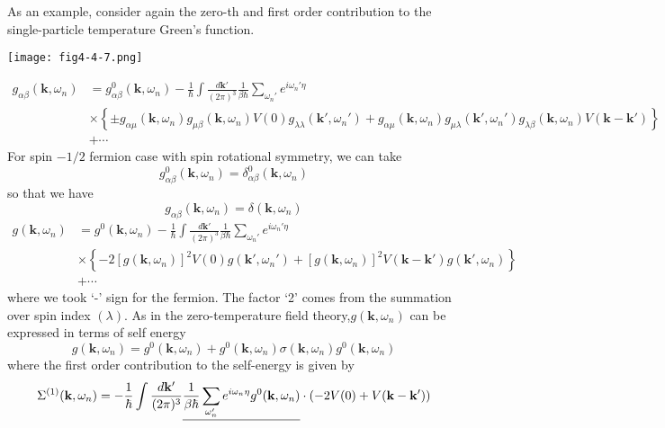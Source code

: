 As an example, consider again the zero-th and first order contribution to the single-particle temperature Green's function.
\begin{center}
\texttt{[image: fig4-4-7.png]}
\end{center}
\begin{equation}
\begin{aligned}
g_{\alpha\beta}(\mathbf{k},\omega_n)&=g_{\alpha\beta}^0(\mathbf{k},\omega_n)-\frac{1}{\hbar}\int\frac{d\mathbf{k}'}{(2\pi)^3}\frac{1}{\beta\hbar} \sum_{\omega_n'} e^{i\omega_n'\eta}\\
&\times\left\{\pm g_{\alpha\mu}(\mathbf{k},\omega_n)g_{\mu\beta}(\mathbf{k},\omega_n) V(0) g_{\lambda\lambda}(\mathbf{k}',\omega_n')+ g_{\alpha\mu}(\mathbf{k},\omega_n) g_{\mu\lambda}(\mathbf{k}',\omega_n') g_{\lambda\beta}(\mathbf{k},\omega_n) V(\mathbf{k}-\mathbf{k}')\right\}\\
&+\cdots
\end{aligned}
\end{equation}
For spin $-1/2$ fermion case with spin rotational symmetry, we can take
\[
g_{\alpha\beta}^0(\mathbf{k},\omega_n)=\delta_{\alpha\beta}^0(\mathbf{k},\omega_n)
\]
so that we have
\[
g_{\alpha\beta}(\mathbf{k},\omega_n)=\delta(\mathbf{k},\omega_n)
\]
\begin{equation}
\begin{aligned}
g(\mathbf{k},\omega_n)&=g^0(\mathbf{k},\omega_n)-\frac{1}{\hbar}\int\frac{d\mathbf{k}'}{(2\pi)^3}\frac{1}{\beta\hbar} \sum_{\omega_n'} e^{i\omega_n'\eta}\\
&\times\left\{-2\left[g(\mathbf{k},\omega_n)\right]^2 V(0) g(\mathbf{k}',\omega_n')+ \left[g(\mathbf{k},\omega_n)\right]^2 V(\mathbf{k}-\mathbf{k}') g(\mathbf{k}',\omega_n) \right\}\\
&+\cdots
\end{aligned}
\end{equation}
where we took `-' sign for the fermion.
The factor `2' comes from the summation over spin index $(\lambda)$.
As in the zero-temperature field theory,$g(\mathbf{k},\omega_n)$ can be expressed in terms of self energy
\begin{equation}
g(\mathbf{k},\omega_n)=g^0(\mathbf{k},\omega_n)+g^0(\mathbf{k},\omega_n)\sigma (\mathbf{k},\omega_n) g^0(\mathbf{k},\omega_n)
\end{equation}
where the first order contribution to the self-energy is given by
\begin{equation}
\Sigma^{(1)}(\mathbf{k},\omega_n)=-\frac{1}{\hbar}\int \frac{d\mathbf{k}'}{(2\pi)^3} \uline{\frac{1}{\beta\hbar} \sum_{\omega_n'} e^{i\omega_n\eta} g^0(\mathbf{k},\omega_n)}\cdot\left(-2V(0)+V(\mathbf{k}-\mathbf{k}')\right)
\end{equation}
